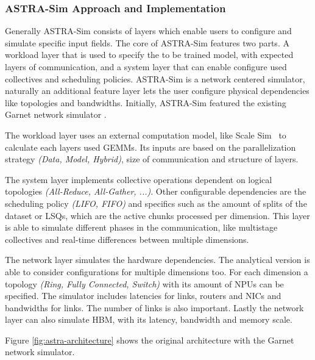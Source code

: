 \subsubsection*{ASTRA-Sim Approach and Implementation}
Generally \ac{ASTRA-Sim} consists of layers which enable users to configure and simulate specific input fields. The core of ASTRA-Sim features two parts. A workload layer that is used to specify the to be trained model, with expected layers of communication, and a system layer that can enable configure used collectives and scheduling policies.
\ac{ASTRA-Sim} is a network centered simulator, naturally an additional feature layer lets the user configure physical dependencies like topologies and bandwidths.
Initially, \ac{ASTRA-Sim} featured the existing Garnet network simulator \cite{agarwal_garnet_2009}. %

The workload layer uses an external computation model, like Scale Sim~\cite{samajdar_scale-sim_2019} to calculate each layers used \acp{GEMM}. Its inputs are based on the parallelization strategy \textit{(Data, Model, Hybrid)}, size of communication and structure of layers. 

The system layer implements collective operations dependent on logical topologies \textit{(All-Reduce, All-Gather, ...)}. Other configurable dependencies are the scheduling policy \textit{(\ac{LIFO}, \ac{FIFO})} and specifics such as the amount of splits of the dataset or \acp{LSQ}, which are the active chunks processed per dimension. This layer is able to simulate different phases in the communication, like multistage collectives and real-time differences between multiple dimensions.

The network layer simulates the hardware dependencies. The analytical version is able to consider configurations for multiple dimensions too. For each dimension a topology \textit{(Ring, Fully Connected, Switch)} with its amount of \acp{NPU} can be specified. The simulator includes latencies for links, routers and \acp{NIC} and bandwidths for links. The number of links is also important. Lastly the network layer can also simulate \ac{HBM}, with its latency, bandwidth and memory scale. 

Figure \ref{fig:astra-architecture} shows the original architecture with the Garnet network simulator.

